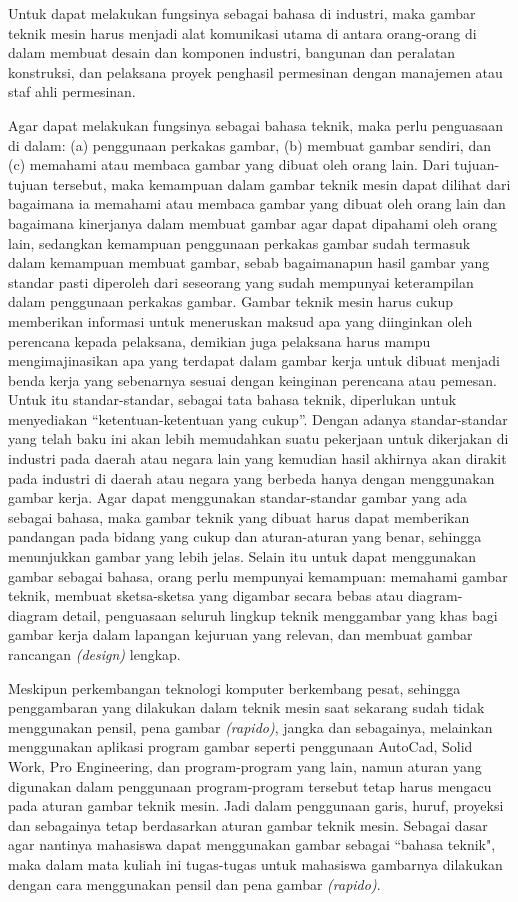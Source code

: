 \documentclass[11pt]{simart} %
\begin{document}
Untuk dapat melakukan fungsinya sebagai bahasa di industri, maka gambar teknik mesin harus menjadi alat komunikasi utama di antara orang-orang di dalam membuat desain dan komponen industri, bangunan dan peralatan konstruksi, dan pelaksana proyek penghasil permesinan dengan manajemen atau staf ahli permesinan.

Agar dapat melakukan fungsinya sebagai bahasa teknik, maka perlu penguasaan di dalam: (a) penggunaan perkakas gambar, (b) membuat gambar sendiri, dan (c) memahami atau membaca gambar yang dibuat oleh orang lain.
Dari tujuan-tujuan tersebut, maka kemampuan dalam gambar teknik mesin dapat dilihat dari bagaimana ia memahami atau membaca gambar yang dibuat oleh orang lain dan bagaimana kinerjanya dalam membuat gambar agar dapat dipahami oleh orang lain, sedangkan kemampuan penggunaan perkakas gambar sudah termasuk dalam kemampuan membuat gambar, sebab bagaimanapun hasil gambar yang standar pasti diperoleh dari seseorang yang sudah mempunyai keterampilan dalam penggunaan perkakas gambar.
Gambar teknik mesin harus cukup memberikan informasi untuk meneruskan maksud apa yang diinginkan oleh perencana kepada pelaksana, demikian juga pelaksana harus mampu mengimajinasikan apa yang terdapat dalam gambar kerja untuk dibuat menjadi benda kerja yang sebenarnya sesuai dengan keinginan perencana atau pemesan. Untuk itu standar-standar, sebagai tata bahasa teknik, diperlukan untuk menyediakan “ketentuan-ketentuan yang cukup”. Dengan adanya standar-standar yang telah baku ini akan lebih memudahkan suatu pekerjaan untuk dikerjakan di industri pada daerah atau negara lain yang kemudian hasil akhirnya akan dirakit pada industri di daerah atau negara yang berbeda hanya dengan menggunakan gambar kerja.
Agar dapat menggunakan standar-standar gambar yang ada sebagai bahasa, maka gambar teknik yang dibuat harus dapat memberikan pandangan pada bidang yang cukup dan aturan-aturan yang benar, sehingga menunjukkan gambar yang lebih jelas. Selain itu untuk dapat menggunakan gambar sebagai bahasa, orang perlu mempunyai kemampuan: memahami gambar teknik, membuat sketsa-sketsa yang digambar secara bebas atau diagram-diagram detail, penguasaan seluruh lingkup teknik menggambar yang khas bagi gambar kerja dalam lapangan kejuruan yang relevan, dan membuat gambar rancangan \textit{(design)} lengkap.

Meskipun perkembangan teknologi komputer berkembang pesat, sehingga penggambaran yang dilakukan dalam teknik mesin saat sekarang sudah tidak menggunakan pensil, pena gambar \textit{(rapido)}, jangka dan sebagainya, melainkan menggunakan aplikasi program gambar seperti penggunaan AutoCad, Solid Work, Pro Engineering, dan program-program yang lain, namun aturan yang digunakan dalam penggunaan program-program tersebut tetap harus mengacu pada aturan gambar teknik mesin. Jadi dalam penggunaan garis, huruf, proyeksi dan sebagainya tetap berdasarkan aturan gambar teknik mesin.
Sebagai dasar agar nantinya mahasiswa dapat menggunakan gambar sebagai ``bahasa teknik", maka dalam mata kuliah ini tugas-tugas untuk mahasiswa gambarnya dilakukan dengan cara menggunakan pensil dan pena gambar \textit{(rapido)}.
\end{document}
